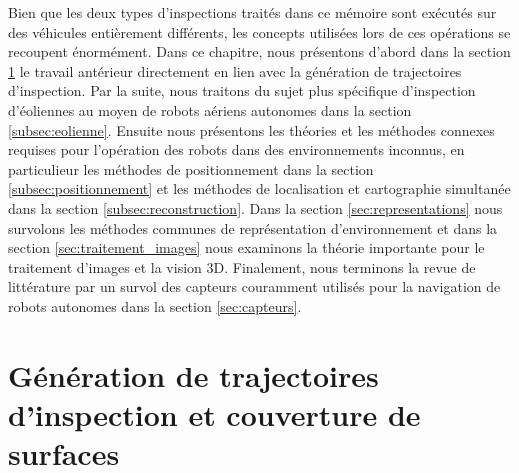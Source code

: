 \label{sec:RevLitt}
%

Bien que les deux types d'inspections traités dans ce mémoire sont exécutés sur des véhicules entièrement différents, les concepts utilisées lors de ces opérations se recoupent énormément. Dans ce chapitre, nous présentons d'abord dans la section \ref{subsec:generation} le travail antérieur directement en lien avec la génération de trajectoires d'inspection. Par la suite, nous traitons du sujet plus spécifique d'inspection d'éoliennes au moyen de robots aériens autonomes dans la section \ref{subsec:eolienne}. Ensuite nous présentons les théories et les méthodes connexes requises pour l'opération des robots dans des environnements inconnus, en particulieur les méthodes de positionnement dans la section \ref{subsec:positionnement} et les méthodes de localisation et cartographie simultanée dans la section \ref{subsec:reconstruction}. Dans la section \ref{sec:representations} nous survolons les méthodes communes de représentation d'environnement et dans la section \ref{sec:traitement_images} nous examinons la théorie importante pour le traitement d'images et la vision 3D. Finalement, nous terminons la revue de littérature par un survol des capteurs couramment utilisés pour la navigation de robots autonomes dans la section \ref{sec:capteurs}.

\section{Génération de trajectoires d'inspection et couverture de surfaces}\label{subsec:generation}

